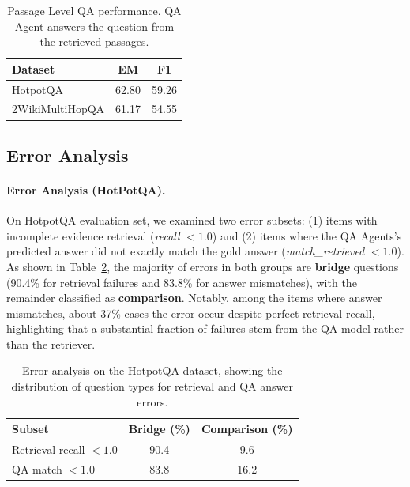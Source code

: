 \documentclass{article} %
\begin{document}
\begin{table}[h]
\centering
\small
\setlength{\tabcolsep}{6pt} %
\caption{Passage Level QA performance. QA Agent answers the question from the retrieved passages.}

\begin{tabular}{l|c|c}
\toprule
\textbf{Dataset} & \textbf{EM} & \textbf{F1} \\
\midrule
HotpotQA & 62.80 & {59.26} \\
\midrule
2WikiMultiHopQA & 61.17 & {54.55} \\
\bottomrule
\end{tabular}
\label{tab:passage_qa}
\end{table}

\subsection{Error Analysis}
\paragraph{Error Analysis (HotPotQA).}
On HotpotQA evaluation set, we examined two error subsets:
(1) items with incomplete evidence retrieval (\textit{recall} $<1.0$) and
(2) items where the QA Agents’s predicted answer did not exactly match the gold answer (\textit{match\_retrieved} $<1.0$).
As shown in Table~\ref{tab:hotpotqa-error-types}, the majority of errors in both groups are \textbf{bridge} questions
(90.4\% for retrieval failures and 83.8\% for answer mismatches), with the remainder classified as \textbf{comparison}.
Notably, among the items where answer mismatches, about 37\% cases the error occur despite perfect retrieval recall, highlighting that a substantial fraction of failures stem from the QA model rather than the retriever.

\begin{table}[ht]
\centering
\small
\caption{Error analysis on the HotpotQA dataset, showing the distribution of question types for retrieval and QA answer errors.}
\begin{tabular}{l|c|c}
\toprule
\textbf{Subset} & \textbf{Bridge (\%)} & \textbf{Comparison (\%)} \\
\midrule
Retrieval recall $<1.0$ & 90.4 & 9.6 \\
\midrule
QA match $<1.0$         & 83.8 & 16.2 \\
\bottomrule
\end{tabular}
\label{tab:hotpotqa-error-types}
\end{table}
\end{document}
